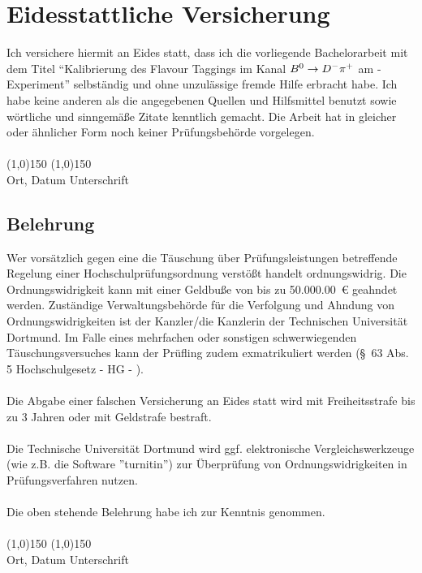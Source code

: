 \section*{Eidesstattliche Versicherung}
\vspace*{1cm}
\noindent
Ich versichere hiermit an Eides statt, dass ich die vorliegende Bachelorarbeit mit dem Titel \enquote{Kalibrierung des Flavour Taggings im Kanal ${{B}^0}\rightarrow{\ensuremath{{D}^-}}{\ensuremath{{\pi}^+}}$ am \lhcb-Experiment} selbst\"andig und ohne unzul\"assige fremde Hilfe erbracht habe. Ich habe keine anderen als die angegebenen
Quellen und Hilfsmittel benutzt sowie w\"ortliche und sinngem\"a\ss e Zitate kenntlich gemacht.
Die Arbeit hat in gleicher oder \"ahnlicher Form noch keiner Pr\"ufungsbeh\"orde vorgelegen.
\vspace*{1cm}
\ \\
\ \\
\line(1,0){150} \hfill \line(1,0){150}\\
Ort, Datum \hfill Unterschrift \hspace*{3cm}
\vspace*{1.5cm}

\subsection*{Belehrung}
Wer vors\"atzlich gegen eine die T\"auschung \"uber Pr\"ufungsleistungen betreffende Regelung einer Hochschulpr\"ufungsordnung
verst\"o\ss t handelt ordnungswidrig. Die Ordnungswidrigkeit kann mit einer Geldbu\ss e von bis zu \SI{50.000,00}{\euro} geahndet werden. Zust\"andige Verwaltungsbeh\"orde f\"ur die Verfolgung und Ahndung von Ordnungswidrigkeiten ist
der Kanzler/die Kanzlerin der Technischen Universit\"at Dortmund. Im Falle eines mehrfachen oder sonstigen schwerwiegenden T\"auschungsversuches kann der Pr\"ufling zudem exmatrikuliert werden (\S\ 63 Abs. 5 Hochschulgesetz - HG - ).\\
\ \\
Die Abgabe einer falschen Versicherung an Eides statt wird mit Freiheitsstrafe bis zu 3 Jahren oder mit Geldstrafe bestraft.\\
\ \\
Die Technische Universit\"at Dortmund wird ggf. elektronische Vergleichswerkzeuge (wie z.B. die Software ''turnitin'') zur \"Uberpr\"ufung von Ordnungswidrigkeiten in Pr\"ufungsverfahren nutzen.\\
\ \\
Die oben stehende Belehrung habe ich zur Kenntnis genommen.
\vspace*{1cm}
\ \\
\ \\
\line(1,0){150} \hfill \line(1,0){150}\\
Ort, Datum \hfill Unterschrift \hspace*{3cm}
\vspace*{\fill}